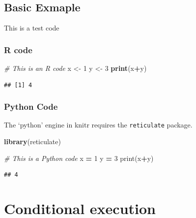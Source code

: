 \documentclass[]{book}
\newenvironment{Shaded}{\begin{snugshade}}{\end{snugshade}}
\newcommand{\BuiltInTok}[1]{#1}
\newcommand{\CommentTok}[1]{\textcolor[rgb]{0.56,0.35,0.01}{\textit{#1}}}
\newcommand{\DecValTok}[1]{\textcolor[rgb]{0.00,0.00,0.81}{#1}}
\newcommand{\KeywordTok}[1]{\textcolor[rgb]{0.13,0.29,0.53}{\textbf{#1}}}
\newcommand{\NormalTok}[1]{#1}
\newcommand{\OperatorTok}[1]{\textcolor[rgb]{0.81,0.36,0.00}{\textbf{#1}}}
\newcommand{\StringTok}[1]{\textcolor[rgb]{0.31,0.60,0.02}{#1}}
\begin{document}
\hypertarget{basic-exmaple}{%
\section{Basic Exmaple}\label{basic-exmaple}}

This is a test code

\hypertarget{r-code}{%
\subsection{R code}\label{r-code}}

\begin{Shaded}
\begin{Highlighting}[]
\CommentTok{# This is an R code}
\NormalTok{x <-}\StringTok{ }\DecValTok{1}
\NormalTok{y <-}\StringTok{ }\DecValTok{3}
\KeywordTok{print}\NormalTok{(x}\OperatorTok{+}\NormalTok{y)}
\end{Highlighting}
\end{Shaded}

\begin{verbatim}
## [1] 4
\end{verbatim}

\hypertarget{python-code}{%
\subsection{Python Code}\label{python-code}}

The `python' engine in knitr requires the \texttt{reticulate} package.

\begin{Shaded}
\begin{Highlighting}[]
\KeywordTok{library}\NormalTok{(reticulate)}
\end{Highlighting}
\end{Shaded}

\begin{Shaded}
\begin{Highlighting}[]
\CommentTok{# This is a Python code}
\NormalTok{x }\OperatorTok{=} \DecValTok{1}
\NormalTok{y }\OperatorTok{=} \DecValTok{3}
\BuiltInTok{print}\NormalTok{(x}\OperatorTok{+}\NormalTok{y)}
\end{Highlighting}
\end{Shaded}

\begin{verbatim}
## 4
\end{verbatim}

\hypertarget{conditional-execution}{%
\chapter{Conditional execution}\label{conditional-execution}}
\end{document}
